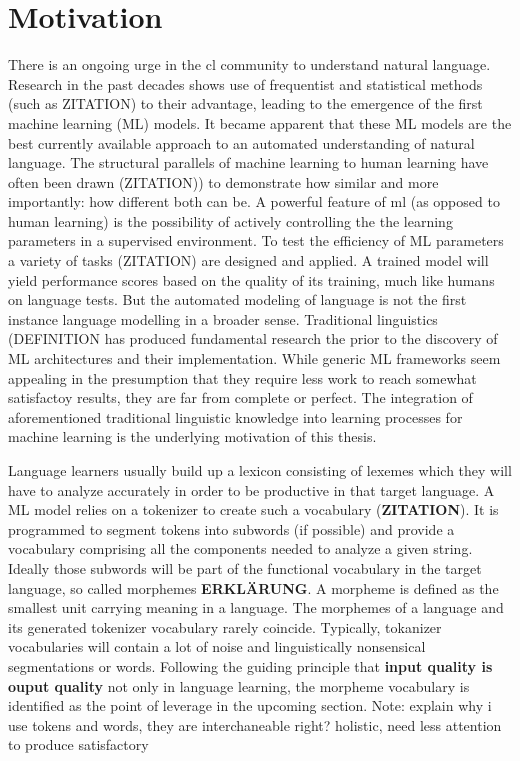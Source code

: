 \documentclass[english]{ttlab-qualify}
\begin{document}
    \section{Motivation}
    There is an ongoing urge in the \acf{cl} community to understand natural language.
    Research in the past decades shows use of frequentist and statistical methods (such as \uppercase{ZITATION}) to their advantage, leading to the emergence of the first machine learning (ML) models.
    It became apparent that these ML models are the best currently available approach to an automated understanding of natural language.
    The structural parallels of machine learning to human learning have often been drawn (\uppercase{zitation)}) to demonstrate how similar and more importantly: how different both can be.
    A powerful feature of \ac{ml} (as opposed to human learning) is the possibility of actively controlling the the learning parameters in a supervised environment.
    To test the efficiency of \uppercase{ML} parameters a variety of tasks (\uppercase{zitation}) are designed and applied.
    A trained model will yield performance scores based on the quality of its training, much like humans on language tests.
    But the automated modeling of language is not the first instance language modelling in a broader sense.
    Traditional linguistics (\uppercase{definition} has produced fundamental research the prior to the discovery of \uppercase{ML} architectures and their implementation.
    While generic ML frameworks seem appealing in the presumption that they require less work to reach somewhat satisfactoy results,
    they are far from complete or perfect. The integration of aforementioned traditional linguistic knowledge into learning processes for machine learning is the underlying motivation of this thesis.

    Language learners usually build up a lexicon consisting of lexemes which they will have to analyze accurately in order to be productive in that target language.
    A ML model relies on a tokenizer to create such a vocabulary  (\textbf{ZITATION}).
    It is programmed to segment tokens into subwords (if possible) and provide a vocabulary comprising all the components needed to analyze a given string.
    Ideally those subwords will be part of the functional vocabulary in the target language, so called morphemes \textbf{ERKLÄRUNG}.
    A morpheme is defined as the smallest unit carrying meaning in a language.
    The morphemes of a language and its generated tokenizer vocabulary rarely coincide.
    Typically, tokanizer vocabularies will contain a lot of noise and linguistically nonsensical segmentations or words.
    Following the guiding principle that \textbf{input quality is ouput quality} not only in language learning, the morpheme vocabulary is identified as the point of leverage in the upcoming section.
    Note: explain why i use tokens and words, they are interchaneable right?
    holistic, need less attention to produce satisfactory
\end{document}
